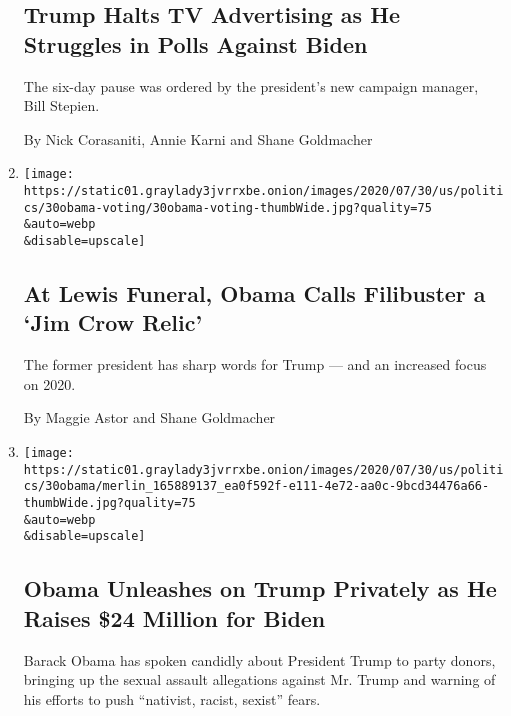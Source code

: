 \begin{enumerate}
  \hypertarget{trump-halts-tv-advertising-as-he-struggles-in-polls-against-biden}{%
  \subsection{Trump Halts TV Advertising as He Struggles in Polls
  Against
  Biden}\label{trump-halts-tv-advertising-as-he-struggles-in-polls-against-biden}}

  The six-day pause was ordered by the president's new campaign manager,
  Bill Stepien.

  By Nick Corasaniti, Annie Karni and Shane Goldmacher
\item
  \href{/2020/07/30/us/politics/john-lewis-funeral-barack-obama.html}{}

  \texttt{[image: https://static01.graylady3jvrrxbe.onion/images/2020/07/30/us/politics/30obama-voting/30obama-voting-thumbWide.jpg?quality=75\\\&auto=webp\\\&disable=upscale]}

  \hypertarget{at-lewis-funeral-obama-calls-filibuster-a-jim-crow-relic}{%
  \subsection{At Lewis Funeral, Obama Calls Filibuster a `Jim Crow
  Relic'}\label{at-lewis-funeral-obama-calls-filibuster-a-jim-crow-relic}}

  The former president has sharp words for Trump --- and an increased
  focus on 2020.

  By Maggie Astor and Shane Goldmacher
\item
  \href{/2020/07/30/us/politics/obama-trump-biden.html}{}

  \texttt{[image: https://static01.graylady3jvrrxbe.onion/images/2020/07/30/us/politics/30obama/merlin\_165889137\_ea0f592f-e111-4e72-aa0c-9bcd34476a66-thumbWide.jpg?quality=75\\\&auto=webp\\\&disable=upscale]}

  \hypertarget{obama-unleashes-on-trump-privately-as-he-raises-24-million-for-biden}{%
  \subsection{Obama Unleashes on Trump Privately as He Raises \$24
  Million for
  Biden}\label{obama-unleashes-on-trump-privately-as-he-raises-24-million-for-biden}}

  Barack Obama has spoken candidly about President Trump to party
  donors, bringing up the sexual assault allegations against Mr. Trump
  and warning of his efforts to push ``nativist, racist, sexist'' fears.


\end{enumerate}
